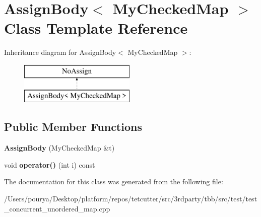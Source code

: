 \hypertarget{classAssignBody_3_01MyCheckedMap_01_4}{}\section{Assign\+Body$<$ My\+Checked\+Map $>$ Class Template Reference}
\label{classAssignBody_3_01MyCheckedMap_01_4}
Inheritance diagram for Assign\+Body$<$ My\+Checked\+Map $>$\+:\begin{figure}[H]
\begin{center}
\leavevmode
\includegraphics[height=2.000000cm]{classAssignBody_3_01MyCheckedMap_01_4}
\end{center}
\end{figure}
\subsection*{Public Member Functions}
\begin{DoxyCompactItemize}
\item 
\hypertarget{classAssignBody_3_01MyCheckedMap_01_4_ab53d56d89acba1445f6e8dafb946f748}{}{\bfseries Assign\+Body} (My\+Checked\+Map \&t)\label{classAssignBody_3_01MyCheckedMap_01_4_ab53d56d89acba1445f6e8dafb946f748}

\item 
\hypertarget{classAssignBody_3_01MyCheckedMap_01_4_affdb81ff5c8ee4a86c81db9293b5018b}{}void {\bfseries operator()} (int i) const \label{classAssignBody_3_01MyCheckedMap_01_4_affdb81ff5c8ee4a86c81db9293b5018b}

\end{DoxyCompactItemize}


The documentation for this class was generated from the following file\+:\begin{DoxyCompactItemize}
\item 
/\+Users/pourya/\+Desktop/platform/repos/tetcutter/src/3rdparty/tbb/src/test/test\+\_\+concurrent\+\_\+unordered\+\_\+map.\+cpp\end{DoxyCompactItemize}
